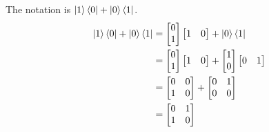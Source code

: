 \documentclass[11pt]{article}
\begin{document}
\begin{enumerate}
        The notation is $\ket{1}\bra{0} + \ket{0}\bra{1}$.
\begin{align*}
        \ket{1}\bra{0} + \ket{0}\bra{1}
        &= \begin{bmatrix}
            0 \\ 1
        \end{bmatrix}
        \begin{bmatrix}
            1 & 0
        \end{bmatrix}
        + \ket{0}\bra{1} \\
        &= \begin{bmatrix}
            0 \\ 1
        \end{bmatrix}
        \begin{bmatrix}
            1 & 0
        \end{bmatrix}
        +
        \begin{bmatrix}
            1 \\ 0
        \end{bmatrix}
        \begin{bmatrix}
            0 & 1
        \end{bmatrix} \\
        &= \begin{bmatrix}
            0 & 0 \\
            1 & 0 
        \end{bmatrix}
        + 
        \begin{bmatrix}
            0 & 1 \\
            0 & 0 
        \end{bmatrix} \\
        &= \begin{bmatrix}
            0 & 1 \\
            1 & 0
        \end{bmatrix}
    \end{align*}


\end{enumerate}
\end{document}
